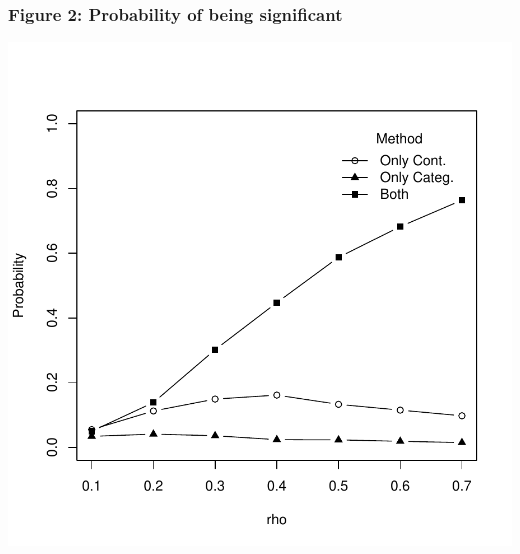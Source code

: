 \documentclass{article}
\begin{document}
\subsubsection*{Figure 2: Probability of being significant}

\includegraphics{probabilities4-bb}
\end{document}
